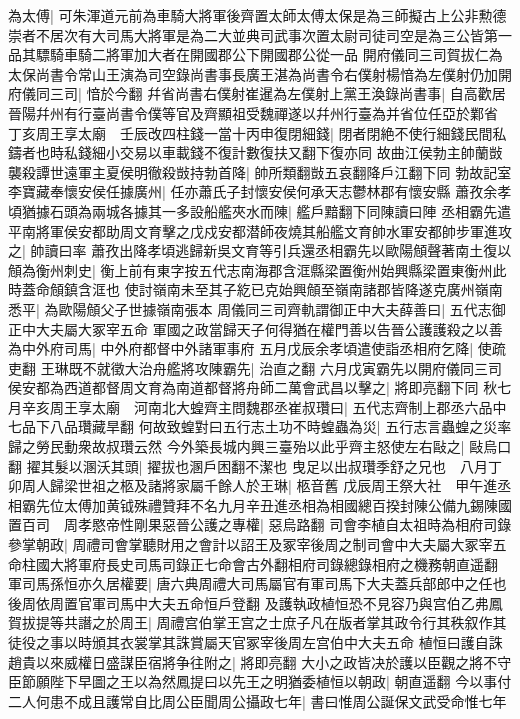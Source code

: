 為太傅|{
	可朱渾道元前為車騎大將軍後齊置太師太傅太保是為三師擬古上公非勲德崇者不居次有大司馬大將軍是為二大並典司武事次置太尉司徒司空是為三公皆第一品其驃騎車騎二將軍加大者在開國郡公下開國郡公從一品}
開府儀同三司賀拔仁為太保尚書令常山王演為司空錄尚書事長廣王湛為尚書令右僕射楊愔為左僕射仍加開府儀同三司|{
	愔於今翻}
幷省尚書右僕射崔暹為左僕射上黨王渙錄尚書事|{
	自高歡居晉陽幷州有行臺尚書令僕等官及齊顯祖受魏禪遂以幷州行臺為并省位任亞於鄴省}
丁亥周王享太廟　壬辰改四柱錢一當十丙申復閉細錢|{
	閉者閉絶不使行細錢民間私鑄者也時私錢細小交易以車載錢不復計數復扶又翻下復亦同}
故曲江侯勃主帥蘭敱襲殺譚世遠軍主夏侯明徹殺敱持勃首降|{
	帥所類翻敱五哀翻降戶江翻下同}
勃故記室李寶藏奉懷安侯任據廣州|{
	任亦蕭氏子封懷安侯何承天志鬱林郡有懷安縣}
蕭孜余孝頃猶據石頭為兩城各據其一多設船艦夾水而陳|{
	艦戶黯翻下同陳讀曰陣}
丞相霸先遣平南將軍侯安都助周文育擊之戊戍安都潜師夜燒其船艦文育帥水軍安都帥步軍進攻之|{
	帥讀曰率}
蕭孜出降孝頃逃歸新吳文育等引兵還丞相霸先以歐陽頠聲著南土復以頠為衡州刺史|{
	衡上前有東字按五代志南海郡含洭縣梁置衡州始興縣梁置東衡州此時蓋命頠鎮含洭也}
使討嶺南未至其子紇已克始興頠至嶺南諸郡皆降遂克廣州嶺南悉平|{
	為歐陽頠父子世據嶺南張本}
周儀同三司齊軌謂御正中大夫薛善曰|{
	五代志御正中大夫屬大冢宰五命}
軍國之政當歸天子何得猶在權門善以告晉公護護殺之以善為中外府司馬|{
	中外府都督中外諸軍事府}
五月戊辰余孝頃遣使詣丞相府乞降|{
	使疏吏翻}
王琳既不就徵大治舟艦將攻陳霸先|{
	治直之翻}
六月戊寅霸先以開府儀同三司侯安都為西道都督周文育為南道都督將舟師二萬會武昌以擊之|{
	將即亮翻下同}
秋七月辛亥周王享太廟　河南北大蝗齊主問魏郡丞崔叔瓚曰|{
	五代志齊制上郡丞六品中七品下八品瓚藏旱翻}
何故致蝗對曰五行志土功不時蝗蟲為災|{
	五行志言蟲蝗之災率歸之勞民動衆故叔瓚云然}
今外築長城内興三臺殆以此乎齊主怒使左右敺之|{
	敺烏口翻}
擢其髮以溷沃其頭|{
	擢拔也溷戶困翻不潔也}
曳足以出叔瓚季舒之兄也　八月丁卯周人歸梁世祖之柩及諸將家屬千餘人於王琳|{
	柩音舊}
戊辰周王祭大社　甲午進丞相霸先位太傅加黄钺殊禮贊拜不名九月辛丑進丞相為相國總百揆封陳公備九錫陳國置百司　周孝愍帝性剛果惡晉公護之專權|{
	惡烏路翻}
司會李植自太祖時為相府司錄參掌朝政|{
	周禮司會掌聽財用之會計以詔王及冢宰後周之制司會中大夫屬大冢宰五命柱國大將軍府長史司馬司錄正七命會古外翻相府司錄總錄相府之機務朝直遥翻}
軍司馬孫恒亦久居權要|{
	唐六典周禮大司馬屬官有軍司馬下大夫蓋兵部郎中之任也後周依周置官軍司馬中大夫五命恒戶登翻}
及護執政植恒恐不見容乃與宫伯乙弗鳳賀拔提等共譖之於周王|{
	周禮宫伯掌王宫之士庶子凡在版者掌其政令行其秩叙作其徒役之事以時頒其衣裳掌其誅賞屬天官冢宰後周左宫伯中大夫五命}
植恒曰護自誅趙貴以來威權日盛謀臣宿將争往附之|{
	將即亮翻}
大小之政皆决於護以臣觀之將不守臣節願陛下早圖之王以為然鳳提曰以先王之明猶委植恒以朝政|{
	朝直遥翻}
今以事付二人何患不成且護常自比周公臣聞周公攝政七年|{
	書曰惟周公誕保文武受命惟七年}
